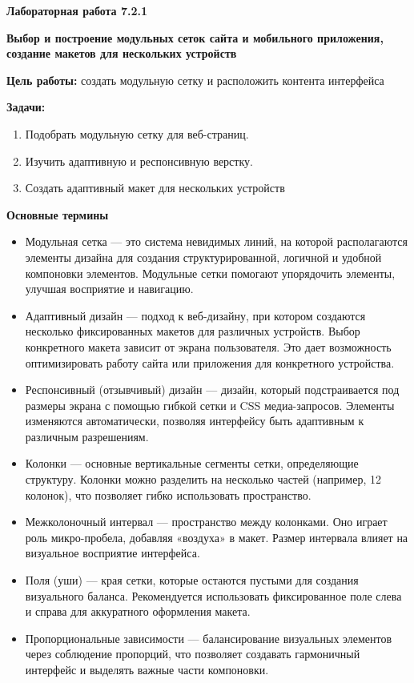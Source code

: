 
\graphicspath{ {7.2.1/models/} }

\pagestyle{fancy}
\fancyhead{}
\renewcommand{\headrulewidth}{0pt}


\begin{center}
    \textbf{Лабораторная работа 7.2.1}

    \textbf{Выбор и построение модульных сеток сайта и мобильного приложения, создание макетов для нескольких устройств}
\end{center}

\textbf{Цель работы:} создать модульную сетку и расположить контента интерфейса
\bigskip

\textbf{Задачи:}

\begin{enumerate}
    \item Подобрать модульную сетку для веб-страниц.
    \item Изучить адаптивную и респонсивную верстку.
    \item Создать адаптивный макет для нескольких устройств
\end{enumerate}
\bigskip

\textbf{Основные термины}

\begin{itemize}
    \item Модульная сетка — это система невидимых линий, на которой располагаются элементы дизайна для создания структурированной, логичной и удобной компоновки элементов. Модульные сетки помогают упорядочить элементы, улучшая восприятие и навигацию.
    \item Адаптивный дизайн — подход к веб-дизайну, при котором создаются несколько фиксированных макетов для различных устройств. Выбор конкретного макета зависит от экрана пользователя. Это дает возможность оптимизировать работу сайта или приложения для конкретного устройства.
    \item Респонсивный (отзывчивый) дизайн — дизайн, который подстраивается под размеры экрана с помощью гибкой сетки и CSS медиа-запросов. Элементы изменяются автоматически, позволяя интерфейсу быть адаптивным к различным разрешениям.
    \item Колонки — основные вертикальные сегменты сетки, определяющие структуру. Колонки можно разделить на несколько частей (например, 12 колонок), что позволяет гибко использовать пространство.
    \item Межколоночный интервал — пространство между колонками. Оно играет роль микро-пробела, добавляя «воздуха» в макет. Размер интервала влияет на визуальное восприятие интерфейса.
    \item Поля (уши) — края сетки, которые остаются пустыми для создания визуального баланса. Рекомендуется использовать фиксированное поле слева и справа для аккуратного оформления макета.
    \item Пропорциональные зависимости — балансирование визуальных элементов через соблюдение пропорций, что позволяет создавать гармоничный интерфейс и выделять важные части компоновки.
\end{itemize}
\bigskip

